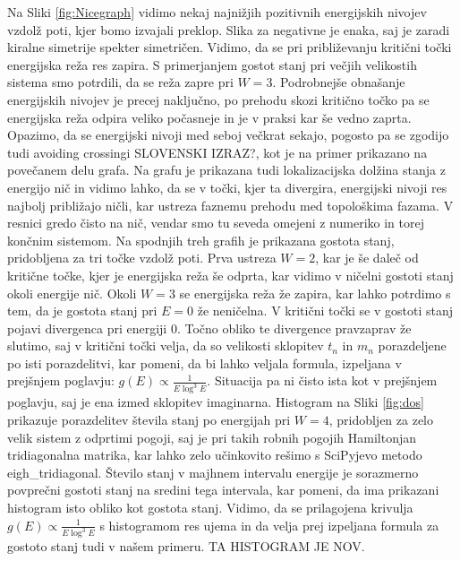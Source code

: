 Na Sliki \ref{fig:Nicegraph} vidimo nekaj najnižjih pozitivnih energijskih nivojev vzdolž poti, kjer bomo izvajali preklop. Slika za negativne je enaka, saj je zaradi kiralne simetrije spekter simetričen. Vidimo, da se pri približevanju kritični točki energijska reža res zapira. S primerjanjem gostot stanj pri večjih velikostih sistema smo potrdili, da se reža zapre pri $W=3$. Podrobnejše obnašanje energijskih nivojev je precej naključno, po prehodu skozi kritično točko pa se energijska reža odpira veliko počasneje in je v praksi kar še vedno zaprta. Opazimo, da se energijski nivoji med seboj večkrat sekajo, pogosto pa se zgodijo tudi avoiding crossingi SLOVENSKI IZRAZ?, kot je na primer prikazano na povečanem delu grafa.
Na grafu je prikazana tudi lokalizacijska dolžina stanja z energijo nič in vidimo lahko, da se v točki, kjer ta divergira, energijski nivoji res najbolj približajo ničli, kar ustreza faznemu prehodu med topološkima fazama. V resnici gredo čisto na nič, vendar smo tu seveda omejeni z numeriko in torej končnim sistemom. 
Na spodnjih treh grafih je prikazana gostota stanj, pridobljena za tri točke vzdolž poti. Prva ustreza $W=2$, kar je še daleč od kritične točke, kjer je energijska reža še odprta, kar vidimo v ničelni gostoti stanj okoli energije nič. Okoli $W=3$ se energijska reža že zapira, kar lahko potrdimo s tem, da je gostota stanj pri $E=0$ že neničelna. V kritični točki se v gostoti stanj pojavi divergenca pri energiji $0$. Točno obliko te divergence pravzaprav že slutimo, saj v kritični točki velja, da so velikosti sklopitev $t_n$ in $m_n$ porazdeljene po isti porazdelitvi, kar pomeni, da bi lahko veljala formula, izpeljana v prejšnjem poglavju: $g(E) \propto \frac{1}{E \log^3 E}$.
Situacija pa ni čisto ista kot v prejšnjem poglavju, saj je ena izmed sklopitev imaginarna. Histogram na Sliki \ref{fig:dos} prikazuje porazdelitev števila stanj po energijah pri $W=4$, pridobljen za zelo velik sistem z odprtimi pogoji, saj je pri takih robnih pogojih Hamiltonjan tridiagonalna matrika, kar lahko zelo učinkovito rešimo s SciPyjevo metodo eigh\_tridiagonal. Število stanj v majhnem intervalu energije je sorazmerno povprečni gostoti stanj na sredini tega intervala, kar pomeni, da ima prikazani histogram isto obliko kot gostota stanj. Vidimo, da se prilagojena krivulja $g(E) \propto \frac{1}{E \log^3 E}$ s histogramom res ujema in da velja prej izpeljana formula za gostoto stanj tudi v našem primeru. TA HISTOGRAM JE NOV.

